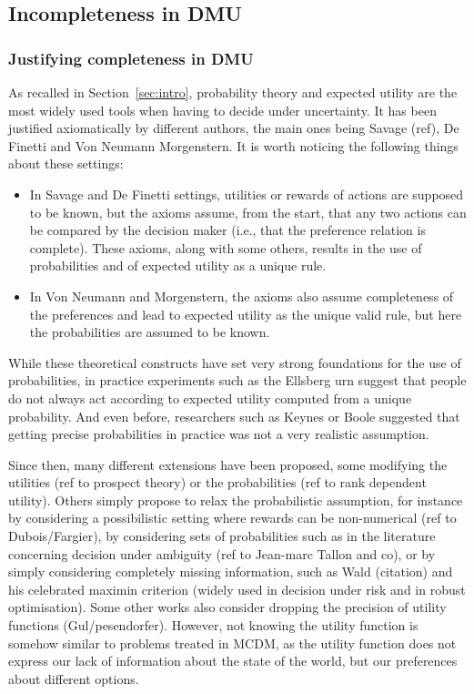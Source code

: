 \documentclass[french, english]{llncs}
\begin{document}
	\subsection{Incompleteness in DMU}
	
	\subsubsection{Justifying completeness in DMU}
	
	As recalled in Section~\ref{sec:intro}, probability theory and expected utility are the most widely used tools when having to decide under uncertainty. It has been justified axiomatically by different authors, the main ones being Savage (ref), De Finetti and Von Neumann Morgenstern. It is worth noticing the following things about these settings:
	\begin{itemize}
		\item In Savage and De Finetti settings, utilities or rewards of actions are supposed to be known, but the axioms assume, from the start, that any two actions can be compared by the decision maker (i.e., that the preference relation is complete). These axioms, along with some others, results in the use of probabilities and of expected utility as a unique rule. 
		\item In Von Neumann and Morgenstern,  the axioms also assume completeness of the preferences and lead to expected utility as the unique valid rule, but here the probabilities are assumed to be known.
	\end{itemize}
	While these theoretical constructs have set very strong foundations for the use of probabilities, in practice experiments such as the Ellsberg urn suggest that people do not always act according to expected utility computed from a unique probability. And even before, researchers such as Keynes or Boole suggested that getting precise probabilities in practice was not a very realistic assumption. 
	
	Since then, many different extensions have been proposed, some modifying the utilities (ref to prospect theory) or the probabilities (ref to rank dependent utility). Others simply propose to relax the probabilistic assumption, for instance by considering a possibilistic setting where rewards can be non-numerical (ref to Dubois/Fargier), by considering sets of probabilities such as in the literature concerning decision under ambiguity (ref to Jean-marc Tallon and co), or by simply considering completely missing information, such as Wald (citation)  and his celebrated maximin criterion (widely used in decision under risk and in robust optimisation). Some other works also consider dropping the precision of utility functions (Gul/pesendorfer). However, not knowing the utility function is somehow similar to problems treated in MCDM, as the utility function does not express our lack of information about the state of the world, but our preferences about different options. 
	
\end{document}
